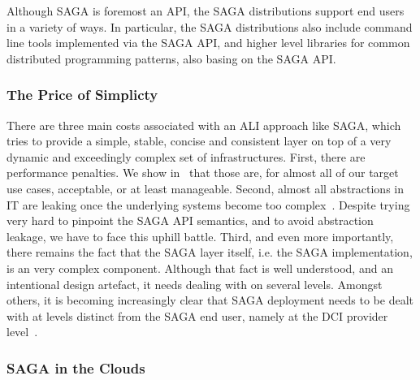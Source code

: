 \documentclass[10pt,conference,final,letterpaper,twoside,twocolumn,]{IEEEtran}
\begin{document}
 Although SAGA is foremost an API, the SAGA distributions support end
 users in a variety of ways.  In particular, the SAGA distributions
 also include command line tools implemented via the SAGA API, and
 higher level libraries for common distributed programming patterns,
 also basing on the SAGA API.


 \subsubsection*{The Price of Simplicty\cite{sagaprice}}

  There are three main costs associated with an ALI approach like
  SAGA, which tries to provide a simple, stable, concise and
  consistent layer on top of a very dynamic and exceedingly complex
  set of infrastructures.  First, there are performance penalties.  We
  show in~\cite{sagaperf} that those are, for almost all of our target
  use cases, acceptable, or at least manageable.  Second, almost all
  abstractions in IT are leaking once the underlying systems become
  too complex~\cite{leaky_abstractions}.  Despite trying very hard to
  pinpoint the SAGA API semantics, and to avoid abstraction leakage,
  we have to face this uphill battle.  Third, and even more
  importantly, there remains the fact that the SAGA layer itself, i.e.
  the SAGA implementation, is an very complex component.  Although
  that fact is well understood, and an intentional design artefact, it
  needs dealing with on several levels.  Amongst others, it is
  becoming increasingly clear that SAGA deployment needs to be dealt
  with at levels distinct from the SAGA end user, namely at the DCI
  provider level~\cite{UMD,XD,TG}.


 \subsubsection*{SAGA in the Clouds}
\end{document}
